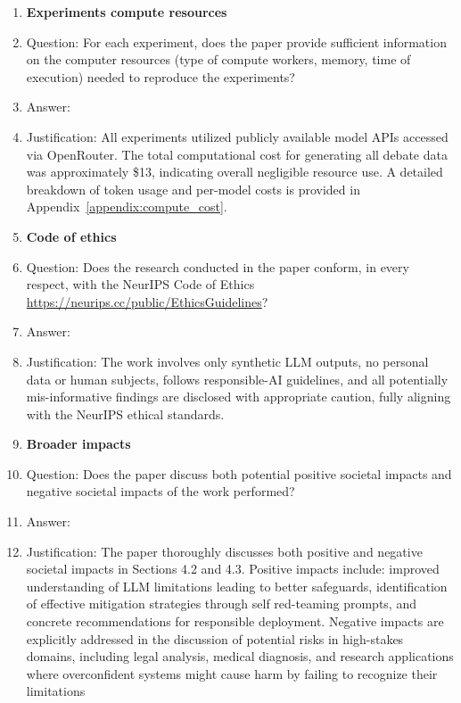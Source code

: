 \documentclass{article}
\begin{document}
\begin{enumerate}
\item {\bf Experiments compute resources}
    \item[] Question: For each experiment, does the paper provide sufficient information on the computer resources (type of compute workers, memory, time of execution) needed to reproduce the experiments?
    \item[] Answer: \answerYes{} %
    \item[] Justification: All experiments utilized publicly available model APIs accessed via OpenRouter. The total computational cost for generating all debate data was approximately \$13, indicating overall negligible resource use. A detailed breakdown of token usage and per-model costs is provided in Appendix~\ref{appendix:compute_cost}.

\item {\bf Code of ethics}
    \item[] Question: Does the research conducted in the paper conform, in every respect, with the NeurIPS Code of Ethics \url{https://neurips.cc/public/EthicsGuidelines}?
    \item[] Answer: \answerYes{} %
    \item[] Justification: The work involves only synthetic LLM outputs, no personal data or human subjects, follows responsible-AI guidelines, and all potentially mis-informative findings are disclosed with appropriate caution, fully aligning with the NeurIPS ethical standards.

\item {\bf Broader impacts}
    \item[] Question: Does the paper discuss both potential positive societal impacts and negative societal impacts of the work performed?
    \item[] Answer: \answerYes{}
    \item[] Justification: The paper thoroughly discusses both positive and negative societal impacts in Sections 4.2 and 4.3. Positive impacts include: improved understanding of LLM limitations leading to better safeguards, identification of effective mitigation strategies through self red-teaming prompts, and concrete recommendations for responsible deployment. Negative impacts are explicitly addressed in the discussion of potential risks in high-stakes domains, including legal analysis, medical diagnosis, and research applications where overconfident systems might cause harm by failing to recognize their limitations


\end{enumerate}
\end{document}

